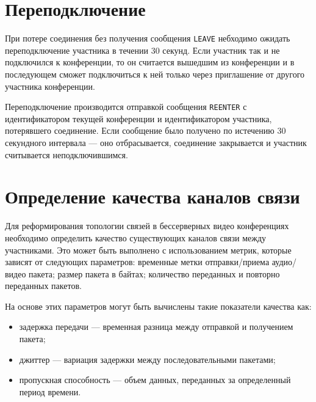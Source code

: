 \section{Переподключение}

При потере соединения без получения сообщения \texttt{LEAVE} небходимо ожидать переподключение участника в течении 30 секунд. Если участник так и не подключился к конференции, то он считается вышедшим из конференции и в последующем сможет подключиться к ней только через приглашение от другого участника конференции.

Переподключение производится отправкой сообщения \texttt{REENTER} с идентификатором текущей конференции и идентификатором участника, потерявшего соединение. Если сообщение было получено по истечению 30 секундного интервала --- оно отбрасывается, соединение закрывается и участник считывается неподключившимся.

\section{Определение качества каналов связи}

Для реформирования топологии связей в бессерверных видео конференциях необходимо определить качество существующих каналов связи между участниками. Это может быть выполнено с использованием метрик, которые зависят от следующих параметров: временные метки отправки/приема аудио/видео пакета; размер пакета в байтах; количество переданных и повторно переданных пакетов.

На основе этих параметров могут быть вычислены такие показатели качества как:
\begin{itemize}[label=---]
  \item задержка передачи --- временная разница между отправкой и получением пакета;
  \item джиттер --- вариация задержки между последовательными пакетами;
  \item пропускная способность --- объем данных, переданных за определенный период времени.
\end{itemize}
